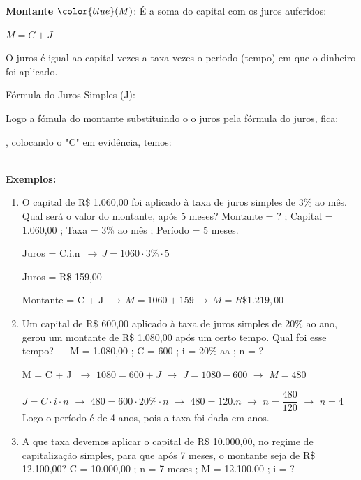 \begin{multicols*}{2}
	\textbf{Montante} $\color{blue}(M)$: É a soma do capital com os juros auferidos:

	\textbf{\color{blue}$M = C + J$}

	O juros é igual ao capital vezes a taxa vezes o periodo (tempo) em que o dinheiro foi aplicado.

	Fórmula do Juros Simples (J):

	\textbf{}

	Logo a fómula do montante substituindo o o juros pela fórmula do juros, fica:

	\textbf{}, colocando o "C" em evidência, temos:

	\textbf{}\\

	\textbf{Exemplos:}

	\begin{enumerate}
		\item O capital de R\$ 1.060,00 foi aplicado à taxa de juros simples de 3\% ao mês. Qual será o valor do montante, após 5 meses?		Montante = ?  ;  Capital = 1.060,00  ;  Taxa = 3\% ao mês  ;  Período = 5 meses.

		      Juros = C.i.n  $\, \rightarrow \,  J = 1060 \cdot 3\% \cdot 5$

		      Juros = R\$ 159,00

		      Montante = C + J $ \, \rightarrow \, M = 1060 + 159 \, \rightarrow \, M = R\$1.219,00$

		\item Um capital de R\$ 600,00 aplicado à taxa de juros simples de 20\% ao ano, gerou  um  montante  de R\$ 1.080,00 após um certo tempo. Qual foi esse tempo?  $\, \, \, \, \, \, $  M = 1.080,00 ; C = 600 ; i = 20\% aa ; n = ?

		      M = C + J $\, \, \rightarrow \, \,  1080 = 600 + J \, \, \rightarrow \, \, J = 1080 - 600 \, \, \rightarrow \, \, M= 480$

		      $ J = C\cdot i \cdot n \, \, \rightarrow \, \, 480 = 600 \cdot 20\% \cdot n \, \, \rightarrow \, \, 480 = 120.n \, \, \rightarrow \, \, n = \dfrac{480}{120}\, \, \rightarrow \, \, n = 4 $ Logo o período é de 4 anos, pois a taxa foi dada em anos.

		\item A que taxa devemos aplicar o capital de R\$ 10.000,00, no regime de capitalização simples, para que após 7 meses, o montante seja de R\$ 12.100,00?  C = 10.000,00  ;  n = 7 meses  ;  M = 12.100,00 ;  i = ?


\end{enumerate}
\end{multicols*}
